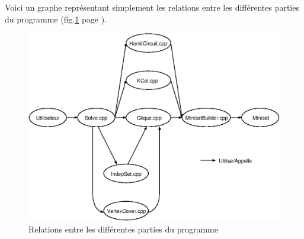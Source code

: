   Voici un graphe représentant simplement les relations entre les
  différentes parties du programme (fig.\ref{grapheExec} page
  \pageref{grapheExec}).
  \begin{figure}[!ht]
   \begin{center}
    \includegraphics{images/grapheExec.eps}
    \caption{Relations entre les différentes parties du
    programme\label{grapheExec}}
   \end{center}
  \end{figure}
